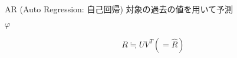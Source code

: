 \documentclass{jsarticle}
\begin{document}
AR (Auto Regression: 自己回帰)
対象の過去の値を用いて予測

$\varphi$

\[
 R \fallingdotseq U V^T (= \hat{R})
\]
\end{document}
